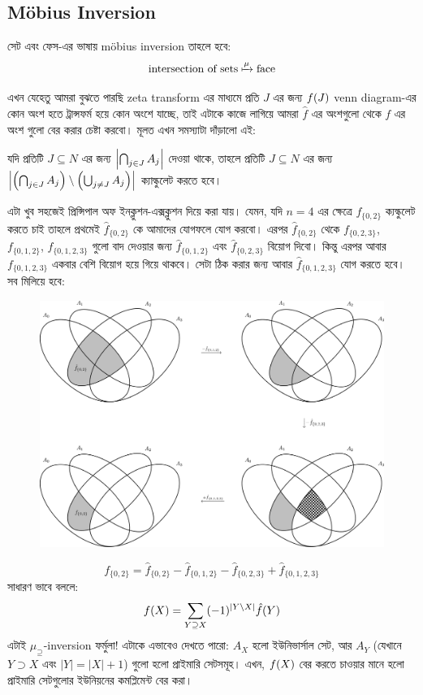 \subsection{M{\"o}bius Inversion}
সেট এবং ফেস-এর ভাষায় m{\"o}bius inversion তাহলে হবে:
\[
  \text{intersection of sets} \xmapsto{\mu} \text{face}
\]

এখন যেহেতু আমরা বুঝতে পারছি zeta transform এর মাধ্যমে প্রতি $J$ এর জন্য
$f(J)$ venn diagram-এর কোন অংশ হতে ট্রান্সফর্ম হয়ে কোন অংশে যাচ্ছে, তাই
এটাকে কাজে লাগিয়ে আমরা $\hat{f}$ এর অংশগুলো থেকে $f$ এর অংশ গুলো বের করার
চেষ্টা করবো। মূলত এখন সমস্যাটা দাঁড়ালো এই:
\begin{reducedproblem}
  যদি প্রতিটি $J \subseteq N$ এর জন্য $\left|  \bigcap_{j \in J} A_j  \right|$ দেওয়া
  থাকে, তাহলে প্রতিটি $J \subseteq N$ এর জন্য $\left|  \left ( \bigcap_{j \in J}
  A_j \right ) \setminus \left ( \bigcup_{j \ne J} A_j \right )  \right|$ ক্যাল্কুলেট করতে হবে।
\end{reducedproblem}
এটা খুব সহজেই প্রিন্সিপাল অফ ইনক্লুশন-এক্সক্লুশন দিয়ে করা যায়। যেমন,
যদি $n=4$ এর ক্ষেত্রে $f_{\{0,2\}}$ ক্যল্কুলেট করতে চাই তাহলে প্রথমেই
$\hat{f}_{\{0,2\}}$ কে আমাদের যোগফলে যোগ করবো। এরপর $\hat{f}_{\{0,2\}}$ থেকে
$f_{\{0,2,3\}}$, $f_{\{0,1,2\}}$, $f_{\{0,1,2,3\}}$ গুলো বাদ দেওয়ার জন্য
$\hat{f}_{\{0,1,2\}}$ এবং $\hat{f}_{\{0,2,3\}}$ বিয়োগ দিবো। কিন্তু এরপর আবার
$f_{\{0,1,2,3\}}$ একবার বেশি বিয়োগ হয়ে গিয়ে থাকবে। সেটা ঠিক করার জন্য আবার
$\hat{f}_{\{0,1,2,3\}}$ যোগ করতে হবে। সব মিলিয়ে হবে:
\begin{figure}[!ht]
  \centering
  \includegraphics[width = \textwidth]{./img/sos-dp/4set/inc_exc.pdf}
\end{figure}
\[
  f_{\{0,2\}} = \hat{f}_{\{0,2\}} - \hat{f}_{\{0,1,2\}} - \hat{f}_{\{0,2,3\}}
  + \hat{f}_{\{0,1,2,3\}}
\]
সাধারণ ভাবে বললে:
\[
  f(X) = \sum_{Y \supseteq X} (-1)^{\left| Y \setminus X \right|} \hat{f}(Y)
\]
এটাই $\mu_\supseteq$-inversion ফর্মুলা! এটাকে এভাবেও দেখতে পারো: $A_X$ হলো
ইউনিভার্সাল সেট, আর $A_Y$ (যেখানে $Y \supset X$ এবং $|Y| = |X|+1$) গুলো হলো
প্রাইমারি সেটসমূহ। এখন, $f(X)$ বের করতে চাওয়ার মানে হলো প্রাইমারি
সেটগুলোর ইউনিয়নের কমপ্লিমেন্ট বের করা।

